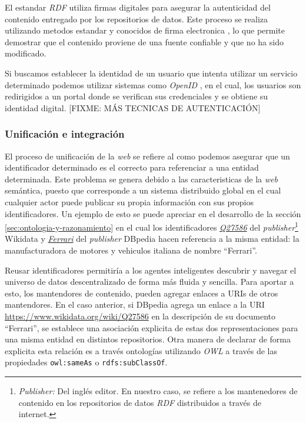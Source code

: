 El estandar \textit{RDF} utiliza firmas digitales para asegurar la autenticidad
del contenido entregado por los repositorios de datos. Este proceso se realiza
utilizando metodos estandar y conocidos de firma electronica
\cite{carroll2003signing}, lo que permite demostrar que el contenido proviene de
una fuente confiable y que no ha sido modificado.

Si buscamos establecer la identidad de un usuario que intenta utilizar un
servicio determinado podemos utilizar sistemas como \textit{OpenID}
\cite{recordon2006openid}, en el cual, los usuarios son redirigidos a un portal
donde se verifican sus credenciales y se obtiene su identidad digital. [FIXME:
MÁS TECNICAS DE AUTENTICACIÓN]

\subsubsection{Unificación e integración}

El proceso de unificación de la \textit{web} se refiere al como podemos asegurar
que un identificador determinado es el correcto para referenciar a una entidad
determinada. Este problema se genera debido a las caracteristicas de la
\textit{web} semántica, puesto que corresponde a un sistema distribuido global
en el cual cualquier actor puede publicar su propia información con sus propios
identificadores. Un ejemplo de esto se puede apreciar en el desarrollo de la
sección \ref{sec:ontologia-y-razonamiento} en el cual los identificadores
\href{https://www.wikidata.org/wiki/Q27586}{\textit{Q27586}} del
\textit{publisher}\footnote{\textit{Publisher:} Del inglés editor. En nuestro
caso, se refiere a los mantenedores de contenido en los repositorios de datos
\textit{RDF} distribuidos a través de internet.} Wikidata y
\href{http://dbpedia.org/page/Ferrari}{\textit{Ferrari}} del \textit{publisher}
DBpedia hacen referencia a la misma entidad: la manufacturadora de motores y
vehiculos italiana de nombre ``Ferrari''.

Reusar identificadores permitiría a los agentes inteligentes descubrir y navegar
el universo de datos descentralizado de forma más fluida y sencilla. Para
aportar a esto, los mantendores de contenido, pueden agregar enlaces a URIs de
otros mantendores. En el caso anterior, si DBpedia agrega un enlace a la URI
\url{https://www.wikidata.org/wiki/Q27586} en la descripción de su documento
``Ferrari'', se establece una asociación explicita de estas dos representaciones
para una misma entidad en distintos repositorios. Otra manera de declarar de
forma explicita esta relación es a través ontologías utilizando \textit{OWL} a
través de las propiedades \texttt{owl:sameAs} o \texttt{rdfs:subClassOf}.

